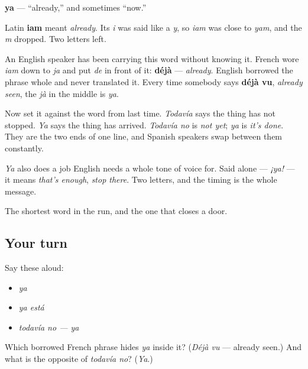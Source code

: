 \begin{cousinweb}
\textbf{ya} — \textquotedblleft{}already,\textquotedblright{} and sometimes \textquotedblleft{}now.\textquotedblright{}

Latin \textbf{iam} meant \emph{already}. Its \emph{i} was said like a \emph{y}, so \emph{iam} was close to \emph{yam}, and the \emph{m} dropped. Two letters left.

An English speaker has been carrying this word without knowing it. French wore \emph{iam} down to \emph{ja} and put \emph{de} in front of it: \textbf{déjà} — \emph{already}. English borrowed the phrase whole and never translated it. Every time somebody says \textbf{déjà vu}, \emph{already seen}, the \emph{jà} in the middle is \emph{ya}.

Now set it against the word from last time. \emph{Todavía} says the thing has not stopped. \emph{Ya} says the thing has arrived. \emph{Todavía no} is \emph{not yet}; \emph{ya} is \emph{it's done}. They are the two ends of one line, and Spanish speakers swap between them constantly.

\emph{Ya} also does a job English needs a whole tone of voice for. Said alone — \emph{¡ya!} — it means \emph{that's enough}, \emph{stop there}. Two letters, and the timing is the whole message.
\end{cousinweb}

\begin{grammarlens}[title={What you've built}]
The shortest word in the run, and the one that closes a door.
\end{grammarlens}

\subsection*{Your turn}
Say these aloud:

\begin{itemize}
\raggedright
  \item \emph{ya}
  \item \emph{ya está}
  \item \emph{todavía no — ya}
\end{itemize}

\begin{tcolorbox}[breakable,colback=teal!4,colframe=teal!35!black,title={Before you move on}]
Which borrowed French phrase hides \emph{ya} inside it? (\emph{Déjà vu} — already seen.) And what is the opposite of \emph{todavía no}? (\emph{Ya}.)
\end{tcolorbox}
